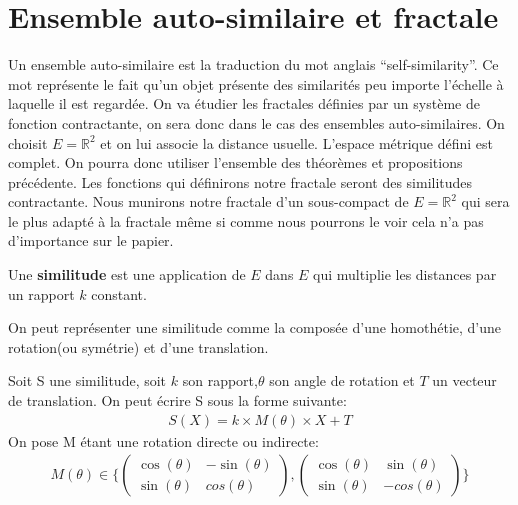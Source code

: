 \documentclass[a4paper, 12pt]{report}
\begin{document}
		\section{Ensemble auto-similaire et fractale}
			Un ensemble auto-similaire est la traduction du mot anglais ``self-similarity''. Ce mot représente le fait qu'un objet présente des similarités peu importe l'échelle à laquelle il est regardée. On va étudier les fractales définies par un système de fonction contractante, on sera donc dans le cas des ensembles auto-similaires. On choisit $E=\mathds{R}^2$ et on lui associe la distance usuelle. L'espace métrique défini est complet. On pourra donc utiliser l'ensemble des théorèmes et propositions précédente. Les fonctions qui définirons notre fractale seront des similitudes contractante. Nous munirons notre fractale d'un sous-compact de $E=\mathds{R}^2$ qui sera le plus adapté à la fractale même si comme nous pourrons le voir cela n'a pas d'importance sur le papier. 
			\begin{definition}
				Une \textbf{similitude} est une application de $E$ dans $E$ qui multiplie les distances par un rapport $k$ constant.
			\end{definition}
			\begin{remark*}
				On peut représenter une similitude comme la composée d'une homothétie, d'une rotation(ou symétrie) et d'une translation.
			\end{remark*}
			\begin{prop}
				Soit S une similitude, soit $k$ son rapport,$\theta$ son angle de rotation et $T$ un vecteur de translation. On peut écrire S sous la forme suivante:
				\begin{align*}
					S(X)=k\times M(\theta)\times X+T
				\end{align*}
				On pose M étant une rotation directe ou indirecte:
				\begin{align*}
					M(\theta)\in\Bigg\{
					\begin{pmatrix}
						\cos(\theta) & -\sin(\theta) \\
						\sin(\theta) & cos(\theta) 
					\end{pmatrix}
					,
					\begin{pmatrix}
						\cos(\theta) & \sin(\theta) \\
						\sin(\theta) & -cos(\theta) 
					\end{pmatrix}
					\Bigg\}
				\end{align*}
			\end{prop}
\end{document}
